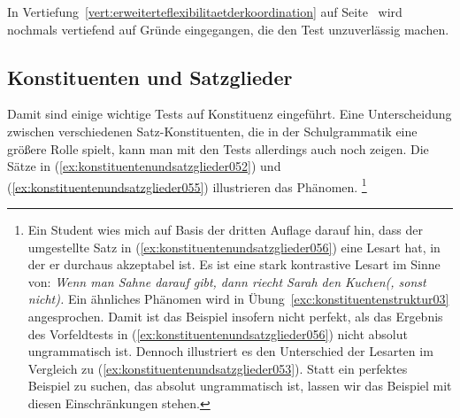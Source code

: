 \begin{exe}
\end{exe}

In Vertiefung~\ref{vert:erweiterteflexibilitaetderkoordination} auf Seite~\pageref{vert:erweiterteflexibilitaetderkoordination} wird nochmals vertiefend auf Gründe eingegangen, die den Test unzuverlässig machen.

\subsection{Konstituenten und Satzglieder}
\label{sec:konstituentenundsatzglieder}

Damit sind einige wichtige Tests auf Konstituenz eingeführt.
Eine Unterscheidung zwischen verschiedenen Satz-Konstituenten, die in der Schulgrammatik eine größere Rolle spielt, kann man mit den Tests allerdings auch noch zeigen.
Die Sätze in (\ref{ex:konstituentenundsatzglieder052}) und (\ref{ex:konstituentenundsatzglieder055}) illustrieren das Phänomen.%
\footnote{Ein Student wies mich auf Basis der dritten Auflage darauf hin, dass der umgestellte Satz in (\ref{ex:konstituentenundsatzglieder056}) eine Lesart hat, in der er durchaus akzeptabel ist.
Es ist eine stark kontrastive Lesart im Sinne von: \textit{Wenn man Sahne darauf gibt, dann riecht Sarah den Kuchen(, sonst nicht).}
Ein ähnliches Phänomen wird in Übung~\ref{exc:konstituentenstruktur03} angesprochen.
Damit ist das Beispiel insofern nicht perfekt, als das Ergebnis des Vorfeldtests in (\ref{ex:konstituentenundsatzglieder056}) nicht absolut ungrammatisch ist.
Dennoch illustriert es den Unterschied der Lesarten im Vergleich zu (\ref{ex:konstituentenundsatzglieder053}).
Statt ein perfektes Beispiel zu suchen, das absolut ungrammatisch ist, lassen wir das Beispiel mit diesen Einschränkungen stehen.}

\begin{sloppypar}
\begin{exe}
  \ex\label{ex:konstituentenundsatzglieder052}
  \begin{xlist}
  \end{xlist}
  \ex\label{ex:konstituentenundsatzglieder055}
  \begin{xlist}
  \end{xlist}
\end{exe}
\end{sloppypar}


